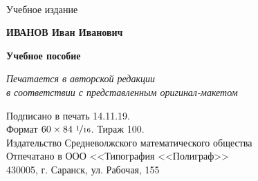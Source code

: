 	\newpage
	\thispagestyle{empty}
	\printindex
	
\newpage
\thispagestyle{empty}

\begin{center}
\ \\
	\vspace{6cm}

	Учебное издание
	
	\vspace{1cm}
	\textbf{ИВАНОВ Иван Иванович}\\

	
	\vspace{1cm}
	\textbf{\LARGE\zhrvTitle}
	
	\vspace{0.5cm}
	\textbf{Учебное пособие}
	
	\vspace{2cm}
	{\it Печатается в авторской редакции\\ в соответствии с представленным оригинал-макетом}
	
	\vspace{1.5cm}
	
		
	\vspace{1cm}
	Подписано в печать 14.11.19.\\ 
	Формат $\displaystyle 60\times84\ \nicefrac{1}{16}$.
	Тираж 100.\\
	\vspace{0.2cm}
	Издательство Средневолжского математического общества\\
	Отпечатано в ООО <<Типография <<Полиграф>>\\
	430005, г. Саранск, ул. Рабочая, 155

\end{center}	
	
